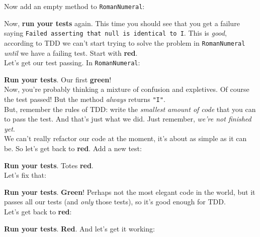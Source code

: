Now add an empty method to \texttt{RomanNumeral}:


Now, \textbf{run your tests} again. This time you should see that you get a failure saying \texttt{Failed asserting that null is identical to \textquotesingle{}I\textquotesingle{}}. This is \textit{good}, according to TDD we can't start trying to solve the problem in \texttt{RomanNumeral} \textit{until} we have a failing test. Start with \textbf{red}.
\\

Let's get our test passing. In \texttt{RomanNumeral}:


\textbf{Run your tests}. Our first \textbf{green}!
\\

Now, you're probably thinking a mixture of confusion and expletives. Of course the test passed! But the method \textit{always} returns \texttt{"I"}.
\\

But, remember the rules of TDD: write the \textit{smallest amount of code} that you can to pass the test. And that's just what we did. Just remember, \textit{we're not finished yet}.
\\

We can't really refactor our code at the moment, it's about as simple as it can be. So let's get back to \textbf{red}. Add a new test:


\textbf{Run your tests}. Totes \textbf{red}.
\\

Let's fix that:


\textbf{Run your tests}. \textbf{Green}! Perhaps not the most elegant code in the world, but it passes all our tests (and \textit{only} those tests), so it's good enough for TDD.
\\

Let's get back to \textbf{red}:



\textbf{Run your tests}. \textbf{Red}. And let's get it working:



